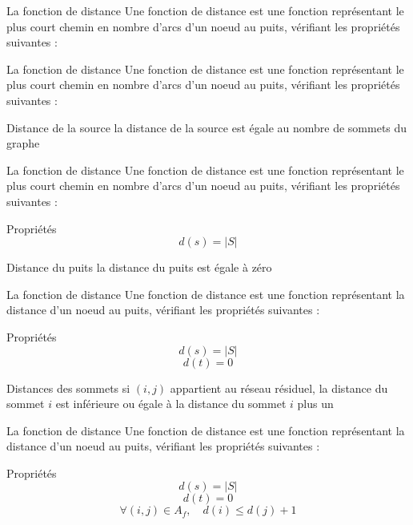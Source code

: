 \begin{frame}{La fonction de distance}
	Une fonction de distance est une fonction représentant le plus court chemin en nombre d'arcs d'un
	noeud au puits, vérifiant les propriétés suivantes :\vfill
\end{frame}

\begin{frame}{La fonction de distance}
	Une fonction de distance est une fonction représentant le plus court chemin en nombre d'arcs d'un
	noeud au puits, vérifiant les propriétés suivantes : \vfill
	\begin{exampleblock}{Distance de la source}
		la distance de la source est égale au nombre de sommets du graphe
	\end{exampleblock} \vfill
\end{frame}

\begin{frame}{La fonction de distance}
	Une fonction de distance est une fonction représentant le plus court chemin en nombre d'arcs d'un
	noeud au puits, vérifiant les propriétés suivantes : \vfill
	\begin{block}{Propriétés}
		$$ d(s) = |S| $$
	\end{block} \vfill
	\begin{exampleblock}{Distance du puits}
		la distance du puits est égale à zéro
	\end{exampleblock} \vfill
\end{frame}

\begin{frame}{La fonction de distance}
	Une fonction de distance est une fonction représentant la distance d'un noeud au puits, vérifiant
	les propriétés suivantes : \vfill
	\begin{block}{Propriétés}
		$$ d(s) = |S| $$
		$$ d(t) = 0 $$
	\end{block} \vfill
	\begin{exampleblock}{Distances des sommets}
		si $(i,j)$ appartient au réseau résiduel, la distance du sommet $i$ est inférieure ou égale à la distance du sommet $i$ plus un
	\end{exampleblock}
\end{frame}

\begin{frame}{La fonction de distance}
	Une fonction de distance est une fonction représentant la distance d'un noeud au puits, vérifiant
	les propriétés suivantes : \vfill
	\begin{block}{Propriétés}
		$$ d(s) = |S| $$
		$$ d(t) = 0 $$
		$$ \forall (i,j) \in A_f,\quad d(i) \leq d(j) + 1 $$
	\end{block}
\end{frame}

